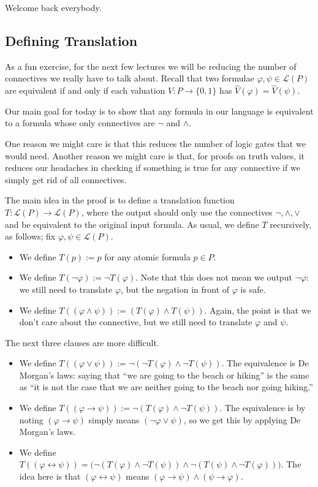 \documentclass[../notes.tex]{subfiles}
\begin{document}

Welcome back everybody.

\subsection{Defining Translation}
As a fun exercise, for the next few lectures we will be reducing the number of connectives we really have to talk about. Recall that two formulae $\varphi,\psi\in\mathcal L(P)$ are equivalent if and only if each valuation $V:P\to\{0,1\}$ has $\hat V(\varphi)=\hat V(\psi)$.

Our main goal for today is to show that any formula in our language is equivalent to a formula whose only connectives are $\lnot$ and $\land$.
\begin{remark}
	One reason we might care is that this reduces the number of logic gates that we would need. Another reason we might care is that, for proofs on truth values, it reduces our headaches in checking if something is true for any connective if we simply get rid of all connectives.
\end{remark}
The main idea in the proof is to define a translation function $T:\mathcal L(P)\to\mathcal L(P)$, where the output should only use the connectives $\lnot,\land,\lor$ and be equivalent to the original input formula. As usual, we define $T$ recursively, as follows; fix $\varphi,\psi\in\mathcal L(P)$.
\begin{itemize}
	\item We define $T(p):=p$ for any atomic formula $p\in P$.
	\item We define $T(\lnot\varphi):=\lnot T(\varphi)$. Note that this does not mean we output $\lnot\varphi$: we still need to translate $\varphi$, but the negation in front of $\varphi$ is safe.
	\item We define $T((\varphi\land\psi)):=(T(\varphi)\land T(\psi))$. Again, the point is that we don't care about the connective, but we still need to translate $\varphi$ and $\psi$.
\end{itemize}
The next three clauses are more difficult.
\begin{itemize}
	\item We define $T((\varphi\lor\psi)):=\lnot(\lnot T(\varphi)\land\lnot T(\psi))$. The equivalence is De Morgan's laws: saying that ``we are going to the beach or hiking'' is the same as ``it is not the case that we are neither going to the beach nor going hiking.''
	\item We define $T((\varphi\to\psi)):=\lnot(T(\varphi)\land\lnot T(\psi))$. The equivalence is by noting $(\varphi\to\psi)$ simply means $(\lnot\varphi\lor\psi)$, so we get this by applying De Morgan's laws.
	\item We define $T((\varphi\leftrightarrow\psi))=\big(\lnot(T(\varphi)\land\lnot T(\psi))\land\lnot(T(\psi)\land\lnot T(\varphi))\big)$. The idea here is that $(\varphi\leftrightarrow\psi)$ means $(\varphi\to\psi)\land(\psi\to\varphi)$.
\end{itemize}
\end{document}
